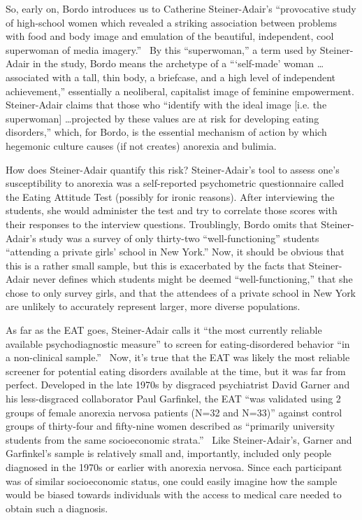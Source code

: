 \documentclass[11pt]{article}
\begin{document}
    So, early on, Bordo introduces us to Catherine Steiner-Adair's ``provocative study of high-school women which revealed a striking association between problems with food and body image and emulation of the beautiful, independent, cool superwoman of media imagery.''~\autocite[47]{Bordo03} By this ``superwoman,'' a term used by Steiner-Adair in the study, Bordo means the archetype of a ```self-made' woman \dots associated with a tall, thin body, a briefcase, and a high level of independent achievement,'' essentially a neoliberal, capitalist image of feminine empowerment. Steiner-Adair claims that those who ``identify with the ideal image [i.e. the superwoman] \dots projected by these values are at risk for developing eating disorders,'' which, for Bordo, is the essential mechanism of action by which hegemonic culture causes (if not creates) anorexia and bulimia.~\autocite[105, 107]{SteinerAdair86} 
    
    How does Steiner-Adair quantify this risk? Steiner-Adair's tool to assess one's susceptibility to anorexia was a self-reported psychometric questionnaire called the Eating Attitude Test (possibly for ironic reasons). After interviewing the students, she would administer the test and try to correlate those scores with their responses to the interview questions. Troublingly, Bordo omits that Steiner-Adair's study was a survey of only thirty-two ``well-functioning'' students ``attending a private girls' school in New York.'' Now, it should be obvious that this is a rather small sample, but this is exacerbated by the facts that Steiner-Adair never defines which students might be deemed ``well-functioning,'' that she chose to only survey girls, and that the attendees of a private school in New York are unlikely to accurately represent larger, more diverse populations.~\autocite[102]{SteinerAdair86}

    As far as the EAT goes, Steiner-Adair calls it ``the most currently reliable available psychodiagnostic measure'' to screen for eating-disordered behavior ``in a non-clinical sample.''~\autocite[103]{SteinerAdair86} Now, it's true that the EAT was likely the most reliable screener for potential eating disorders available at the time, but it was far from perfect. Developed in the late 1970s by disgraced psychiatrist David Garner and his less-disgraced collaborator Paul Garfinkel, the EAT ``was validated using 2 groups of female anorexia nervosa patients (N=32 and N=33)'' against control groups of thirty-four and fifty-nine women described as ``primarily university students from the same socioeconomic strata.''~\autocite[273-274]{Garner79} Like Steiner-Adair's, Garner and Garfinkel's sample is relatively small and, importantly, included only people diagnosed in the 1970s or earlier with anorexia nervosa. Since each participant was of similar socioeconomic status, one could easily imagine how the sample would be biased towards individuals with the access to medical care needed to obtain such a diagnosis. 
\end{document}
